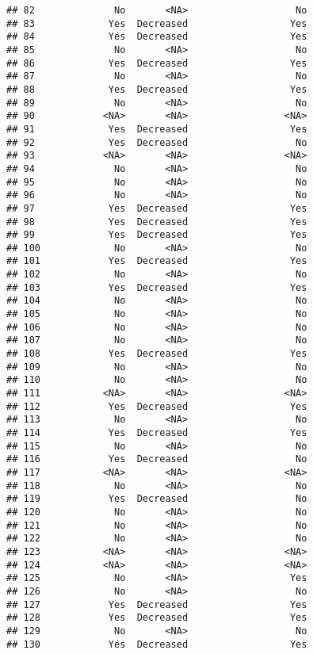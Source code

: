 \documentclass[
]{article}
\begin{document}
\begin{verbatim}
## 82              No       <NA>                   No
## 83             Yes  Decreased                  Yes
## 84             Yes  Decreased                  Yes
## 85              No       <NA>                   No
## 86             Yes  Decreased                  Yes
## 87              No       <NA>                   No
## 88             Yes  Decreased                  Yes
## 89              No       <NA>                   No
## 90            <NA>       <NA>                 <NA>
## 91             Yes  Decreased                  Yes
## 92             Yes  Decreased                   No
## 93            <NA>       <NA>                 <NA>
## 94              No       <NA>                   No
## 95              No       <NA>                   No
## 96              No       <NA>                   No
## 97             Yes  Decreased                  Yes
## 98             Yes  Decreased                  Yes
## 99             Yes  Decreased                  Yes
## 100             No       <NA>                   No
## 101            Yes  Decreased                  Yes
## 102             No       <NA>                   No
## 103            Yes  Decreased                  Yes
## 104             No       <NA>                   No
## 105             No       <NA>                   No
## 106             No       <NA>                   No
## 107             No       <NA>                   No
## 108            Yes  Decreased                  Yes
## 109             No       <NA>                   No
## 110             No       <NA>                   No
## 111           <NA>       <NA>                 <NA>
## 112            Yes  Decreased                  Yes
## 113             No       <NA>                   No
## 114            Yes  Decreased                  Yes
## 115             No       <NA>                   No
## 116            Yes  Decreased                   No
## 117           <NA>       <NA>                 <NA>
## 118             No       <NA>                   No
## 119            Yes  Decreased                   No
## 120             No       <NA>                   No
## 121             No       <NA>                   No
## 122             No       <NA>                   No
## 123           <NA>       <NA>                 <NA>
## 124           <NA>       <NA>                 <NA>
## 125             No       <NA>                  Yes
## 126             No       <NA>                   No
## 127            Yes  Decreased                  Yes
## 128            Yes  Decreased                  Yes
## 129             No       <NA>                   No
## 130            Yes  Decreased                  Yes

\end{verbatim}
\end{document}
